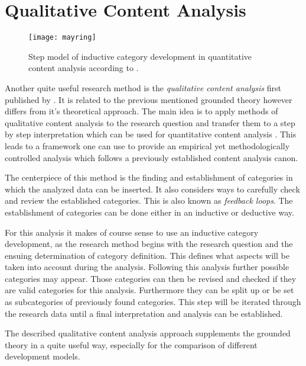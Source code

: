 
\section{Qualitative Content Analysis} %

\begin{figure}[htbp]
  \centering
  \texttt{[image: mayring]}
  \caption{Step model of inductive category development in quantitative content
    analysis according to \citeauthor{Mayring2008} \cite{Mayring2000,Mayring2008}.}
\end{figure}

Another quite useful research method is the \emph{qualitative content analysis}
first published by \textcite{Mayring2008}. It is related to the previous
mentioned grounded theory however differs from it's theoretical approach. The
main idea is to apply methods of qualitative content analysis to the research
question and transfer them to a step by step interpretation which can be used
for quantitative content analysis \cite{Mayring2000}. This leads to a framework
one can use to provide an empirical yet methodologically controlled analysis
which follows a previously established content analysis canon.

The centerpiece of this method is the finding and establishment of categories
in which the analyzed data can be inserted. It also considers ways to carefully
check and review the established categories. This is also known as
\emph{feedback loops}. The establishment of categories can be done either in an
inductive or deductive way.

For this analysis it makes of course sense to use an inductive category
development, as the research method begins with the research question and the
ensuing determination of category definition. This defines what aspects will be
taken into account during the analysis. Following this analysis further
possible categories may appear. Those categories can then be revised and
checked if they are valid categories for this analysis. Furthermore they can be
split up or be set as subcategories of previously found categories. This step
will be iterated through the research data until a final interpretation and
analysis can be established.

The described qualitative content analysis approach supplements the grounded
theory in a quite useful way, especially for the comparison of different
development models.


